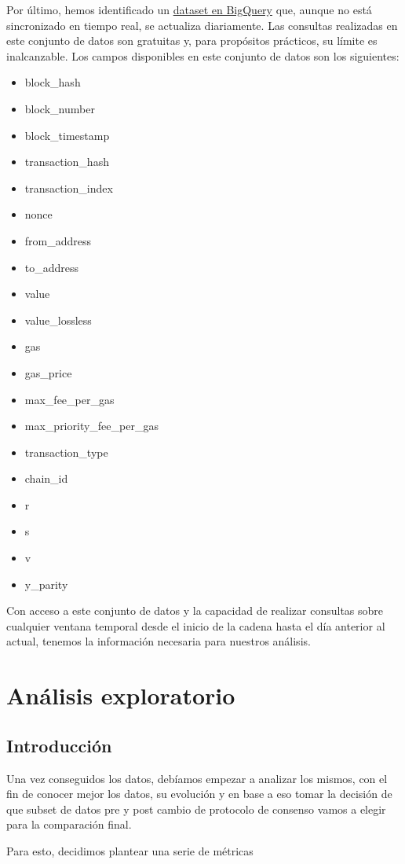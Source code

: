 \documentclass{article}
\begin{document}
Por último, hemos identificado un  \href{https://cloud.google.com/blog/products/data-analytics/ethereum-bigquery-public-dataset-smart-contract-analytics}{dataset en BigQuery} que, aunque no está sincronizado en tiempo real, se actualiza diariamente. Las consultas realizadas en este conjunto de datos son gratuitas y, para propósitos prácticos, su límite es inalcanzable. Los campos disponibles en este conjunto de datos son los siguientes: 
\begin{itemize}
    \item block\_hash
    \item block\_number
    \item block\_timestamp
    \item transaction\_hash
    \item transaction\_index
    \item nonce
    \item from\_address
    \item to\_address
    \item value
    \item value\_lossless
    \item gas
    \item gas\_price
    \item max\_fee\_per\_gas
    \item max\_priority\_fee\_per\_gas
    \item transaction\_type
    \item chain\_id
    \item r
    \item s
    \item v
    \item y\_parity
\end{itemize}
 Con acceso a este conjunto de datos y la capacidad de realizar consultas sobre cualquier ventana temporal desde el inicio de la cadena hasta el día anterior al actual, tenemos la información necesaria para nuestros análisis.


\section{Análisis exploratorio}

\subsection{Introducción}

Una vez conseguidos los datos, debíamos empezar a analizar los mismos, con el fin de conocer mejor los datos, su evolución y en base a eso tomar la decisión de que subset de datos pre y post cambio de protocolo de consenso vamos a elegir para la comparación final.

Para esto, decidimos plantear una serie de métricas 




%
\end{document}
